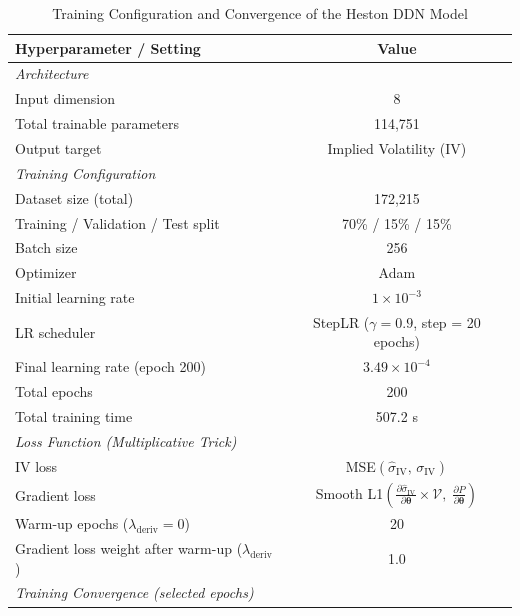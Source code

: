 \begin{table}[htbp]
  \centering
  \caption{Training Configuration and Convergence of the Heston DDN Model}
  \label{tab:training_details}
  \begin{tabular}{lc}
    \toprule
    \textbf{Hyperparameter / Setting} & \textbf{Value} \\
    \midrule
    \multicolumn{2}{l}{\textit{Architecture}} \\
    \quad Input dimension              & 8 \\
    \quad Total trainable parameters   & 114,751 \\
    \quad Output target                & Implied Volatility (IV) \\
    \midrule
    \multicolumn{2}{l}{\textit{Training Configuration}} \\
    \quad Dataset size (total)         & 172,215 \\
    \quad Training / Validation / Test split & 70\% / 15\% / 15\% \\
    \quad Batch size                   & 256 \\
    \quad Optimizer                    & Adam \\
    \quad Initial learning rate        & $1 \times 10^{-3}$ \\
    \quad LR scheduler                 & StepLR ($\gamma=0.9$, step = 20 epochs) \\
    \quad Final learning rate (epoch 200) & $3.49 \times 10^{-4}$ \\
    \quad Total epochs                 & 200 \\
    \quad Total training time          & 507.2 s \\
    \midrule
    \multicolumn{2}{l}{\textit{Loss Function (Multiplicative Trick)}} \\
    \quad IV loss                      & MSE$(\hat{\sigma}_{\text{IV}},\, \sigma_{\text{IV}})$ \\
    \quad Gradient loss                & Smooth L1$\!\left(\tfrac{\partial\hat{\sigma}_{\text{IV}}}{\partial\boldsymbol{\theta}}\!\times\!\mathcal{V},\; \tfrac{\partial P}{\partial\boldsymbol{\theta}}\right)$ \\
    \quad Warm-up epochs ($\lambda_{\text{deriv}}=0$) & 20 \\
    \quad Gradient loss weight after warm-up ($\lambda_{\text{deriv}}$) & 1.0 \\
    \midrule
    \multicolumn{2}{l}{\textit{Training Convergence (selected epochs)}} \\

\end{tabular}
\end{table}
